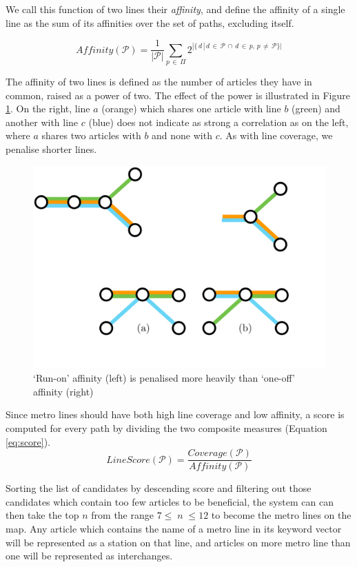 We call this function of two lines their \textit{affinity}, and define the affinity of a single line as the sum of its affinities over the set of paths, excluding itself.

\begin{equation}
	Affinity(\mathcal{P}) = \frac{1}{|\mathcal{P}|} \sum_{p\,\in{\,\Pi}} 2^{|\{\,d\,|\,d\,\in\,{\mathcal{P}}\,\cap\,d\,\in\,{p},\,p\,\neq\,\mathcal{P}\}|}
\end{equation}

The affinity of two lines is defined as the number of articles they have in common, raised as a power of two. The effect of the power is illustrated in Figure \ref{fig:abcaffinity}. On the right, line $a$ (orange) which shares one article with line $b$ (green) and another with line $c$ (blue) does not indicate as strong a correlation as on the left, where $a$ shares two articles with $b$ and none with $c$. As with line coverage, we penalise shorter lines.

\begin{figure}[htbp!]
	\centering
	\includegraphics[width=.8\textwidth]{img/implementation/abcaffinity.pdf}
	\caption{`Run-on' affinity (left) is penalised more heavily than `one-off' affinity (right)}
	\label{fig:abcaffinity}
\end{figure}

Since metro lines should have both high line coverage and low affinity, a score is computed for every path by dividing the two composite measures (Equation \ref{eq:score}).
\begin{equation}
	LineScore(\mathcal{P}) = \frac{Coverage(\mathcal{P})}{Affinity(\mathcal{P})}
	\label{eq:score}
\end{equation}

Sorting the list of candidates by descending score and filtering out those candidates which contain too few articles to be beneficial, the system can can then take the top $n$ from the range $7 \leq\;n\;\leq 12$ to become the metro lines on the map. Any article which contains the name of a metro line in its keyword vector will be represented as a station on that line, and articles on more metro line than one will be represented as interchanges.

